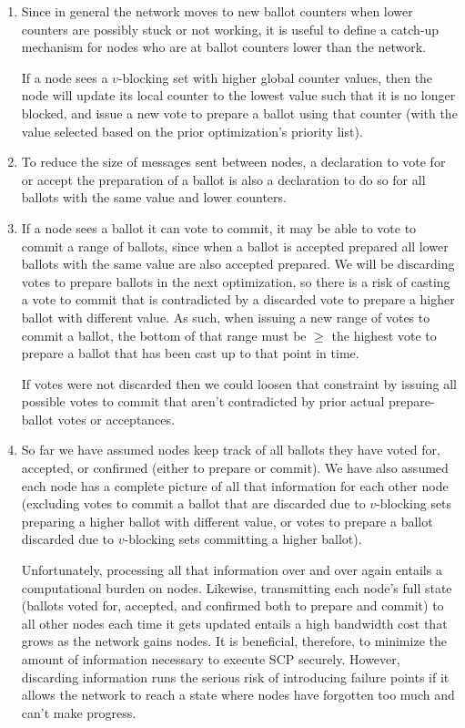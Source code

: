 \begin{enumerate}
    \item Since in general the network moves to new ballot counters when lower counters are possibly stuck or not working, it is useful to define a catch-up mechanism for nodes who are at ballot counters lower than the network.%

    If a node sees a $v$-blocking set with higher global counter values, then the node will update its local counter to the lowest value such that it is no longer blocked, and issue a new vote to prepare a ballot using that counter (with the value selected based on the prior optimization's priority list).

    \item To reduce the size of messages sent between nodes, a declaration to vote for or accept the preparation of a ballot is also a declaration to do so for all ballots with the same value and lower counters.

    \item If a node sees a ballot it can vote to commit, it may be able to vote to commit a range of ballots, since when a ballot is accepted prepared all lower ballots with the same value are also accepted prepared. We will be discarding votes to prepare ballots in the next optimization, so there is a risk of casting a vote to commit that is contradicted by a discarded vote to prepare a higher ballot with different value. As such, when issuing a new range of votes to commit a ballot, the bottom of that range must be $\geq$ the highest vote to prepare a ballot that has been cast up to that point in time.

    If votes were not discarded then we could loosen that constraint by issuing all possible votes to commit that aren't contradicted by prior actual prepare-ballot votes or acceptances.

    \item So far we have assumed nodes keep track of all ballots they have voted for, accepted, or confirmed (either to prepare or commit). We have also assumed each node has a complete picture of all that information for each other node (excluding votes to commit a ballot that are discarded due to $v$-blocking sets preparing a higher ballot with different value, or votes to prepare a ballot discarded due to $v$-blocking sets committing a higher ballot).

    Unfortunately, processing all that information over and over again entails a computational burden on nodes. Likewise, transmitting each node's full state (ballots voted for, accepted, and confirmed both to prepare and commit) to all other nodes each time it gets updated entails a high bandwidth cost that grows as the network gains nodes. It is beneficial, therefore, to minimize the amount of information necessary to execute SCP securely. However, discarding information runs the serious risk of introducing failure points if it allows the network to reach a state where nodes have forgotten too much and can't make progress.


\end{enumerate}
